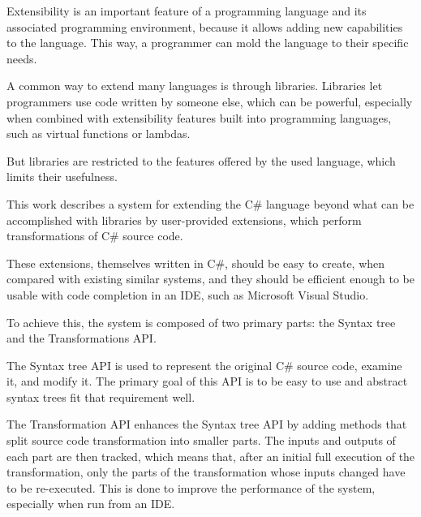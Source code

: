 
Extensibility is an important feature of a programming language and its associated programming environment, because it allows adding new capabilities to the language. This way, a programmer can mold the language to their specific needs.

A common way to extend many languages is through libraries. Libraries let programmers use code written by someone else, which can be powerful, especially when combined with extensibility features built into programming languages, such as virtual functions or lambdas.

But libraries are restricted to the features offered by the used language, which limits their usefulness.

\medskip

This work describes a system for extending the C\# language beyond what can be accomplished with libraries by user-provided extensions, which perform transformations of C\# source code.

These extensions, themselves written in C\#, should be easy to create, when compared with existing similar systems, and they should be efficient enough to be usable with code completion in an \ac{IDE}, such as Microsoft Visual Studio.

To achieve this, the system is composed of two primary parts: the Syntax tree  and the Transformations \acs{API}.

\medskip

The Syntax tree \acs{API} is used to represent the original C\# source code, examine it, and modify it. The primary goal of this \acs{API} is to be easy to use and abstract syntax trees fit that requirement well.

The Transformation \acs{API} enhances the Syntax tree \acs{API} by adding methods that split source code transformation into smaller parts. The inputs and outputs of each part are then tracked, which means that, after an initial full execution of the transformation, only the parts of the transformation whose inputs changed have to be re-executed. This is done to improve the performance of the system, especially when run from an \ac{IDE}.